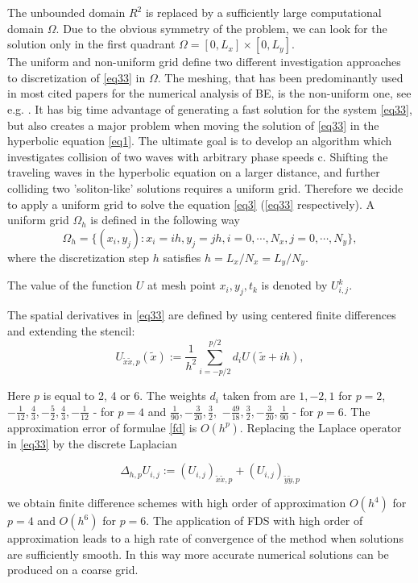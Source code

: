 \documentclass[12pt]{article}
\theoremstyle{theorem}
\theoremstyle{defi}
\begin{document}
The unbounded domain $R^2$ is replaced by a sufficiently large computational domain $\Omega$. Due to the obvious symmetry of the problem, we can look for the solution only in the first quadrant $\Omega = [0,L_x] \times[0,L_y]$.
\\
The uniform and non-uniform grid define two different investigation approaches to discretization of \eqref{eq33} in $\Omega$. The meshing, that has been predominantly used in most cited papers for the numerical analysis of BE, is the non-uniform one, see e.g. \cite{ref6}. It has big time advantage of generating a fast solution for the system \eqref{eq33}, but also creates a major problem when moving the solution of \eqref{eq33} in the hyperbolic equation \eqref{eq1}. The ultimate goal is to develop an algorithm which investigates collision of two waves with arbitrary phase speeds c. Shifting the traveling waves in the hyperbolic equation on a larger distance, and further colliding two 'soliton-like' solutions requires a uniform grid. Therefore we decide to apply a uniform grid to solve the equation \eqref{eq3} (\eqref{eq33} respectively).
A uniform grid $\Omega_h$ is defined in the following way
$$
\Omega_h = \{(x_i,y_j): x_i = ih, y_j = jh, i = 0,\cdots ,N_x, j = 0,\cdots , N_y \},
$$
where the discretization step $h$ satisfies
$ h = L_x/N_x = L_y/N_y$. 

The value of the function $U$ at mesh point $x_i,y_j,t_k$ is denoted by $U_{i,j}^k$.

\par
The spatial derivatives in \eqref{eq33} are defined by using centered finite differences  
and extending the stencil:
\begin{equation}\label{fd}
U_{{\tilde x \tilde x},p}(\tilde x) :=  \frac{1}{h^2} \sum\limits_{i=-p/2}^{p/2} d_i U(\tilde x+ih),
\end{equation}

Here $p$ is equal to 2, 4 or 6.  The weights $d_i$ taken from  \cite{ref17} are  
 $ 1,-2,1$ for $p=2$, 
$-\frac{1}{12}, \frac{4}{3}, -\frac{5}{2}, \frac{4}{3}, -\frac{1}{12}$ - for $p=4$
 and 
$\frac{1}{90}, -\frac{3}{20}, \frac{3}{2},$ $ -\frac{49}{18}, \frac{3}{2}, -\frac{3}{20}, \frac{1}{90}$ - for $p=6$. The approximation error of  formulae \eqref{fd} is $O(h^p)$. Replacing the Laplace operator in \eqref{eq33} by the discrete Laplacian 

$$ \Delta_{h,p} U_{i,j} := (U_{i,j})_{{\tilde x \tilde x},p} + (U_{i,j})_{{\tilde y \tilde y},p}$$ 

we obtain finite difference schemes with high order of approximation $O(h^4)$ for $p=4$ and  $O(h^6)$ for $p=6 $.  The application of FDS with high order of approximation leads to a high rate of convergence of the method when solutions are sufficiently smooth. In this way more accurate numerical solutions can be produced on a coarse grid.
\end{document}
